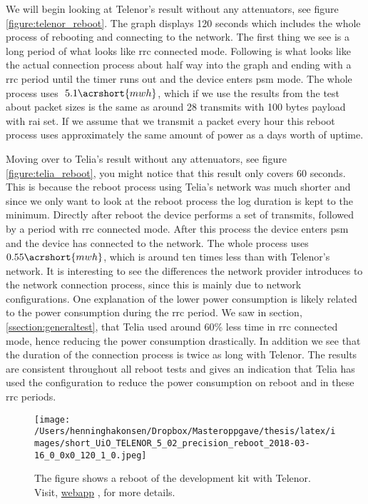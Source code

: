 \documentclass[USenglish]{ifimaster}  %
\begin{document}
We will begin looking at Telenor's result without any attenuators, see figure \vref{figure:telenor_reboot}. The graph displays 120 seconds which includes the whole process of rebooting and connecting to the network. The first thing we see is a long period of what looks like \acrshort{rrc} connected mode. Following is what looks like the actual connection process about half way into the graph and ending with a \acrshort{rrc} period until the timer runs out and the device enters \acrshort{psm} mode. The whole process uses ${~5.1 \acrshort{mwh}}$, which if we use the results from the test about packet sizes is the same as around 28 transmits with 100 bytes payload with \acrshort{rai} set. If we assume that we transmit a packet every hour this reboot process uses approximately the same amount of power as a days worth of uptime.

Moving over to Telia's result without any attenuators, see figure \vref{figure:telia_reboot}, you might notice that this result only covers 60 seconds. This is because the reboot process using Telia's network was much shorter and since we only want to look at the reboot process the log duration is kept to the minimum. Directly after reboot the device performs a set of transmits, followed by a period with \acrshort{rrc} connected mode. After this process the device enters \acrshort{psm} and the device has connected to the network. The whole process uses ${0.55 \acrshort{mwh}}$, which is around ten times less than with Telenor's network. It is interesting to see the differences the network provider introduces to the network connection process, since this is mainly due to network configurations. One explanation of the lower power consumption is likely related to the power consumption during the \acrshort{rrc} period. We saw in section, \vref{ssection:generaltest}, that Telia used around 60\% less time in \acrshort{rrc} connected mode, hence reducing the power consumption drastically. In addition we see that the duration of the connection process is twice as long with Telenor. The results are consistent throughout all reboot tests and gives an indication that Telia has used the configuration to reduce the power consumption on reboot and in these \acrshort{rrc} periods.

\begin{figure}[H]
  \centering
  \texttt{[image: /Users/henninghakonsen/Dropbox/Masteroppgave/thesis/latex/images/short\_UiO\_TELENOR\_5\_02\_precision\_reboot\_2018-03-16\_0\_0x0\_120\_1\_0.jpeg]}
  \caption[Short-term test - device reboot, Telenor]{The figure shows a reboot of the development kit with Telenor. Visit, \href{http://158.39.77.97:9000/\#/results/UiO\_TELENOR\_5.02\_precision\_reboot\_2018-03-16\_0\_0x0\_120\_1\_0}{webapp} \cite{online:result9}, for more details.}
  \label{figure:telenor_reboot}
\end{figure}
\end{document}
